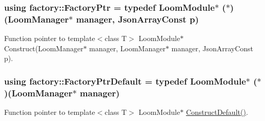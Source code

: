 \subsubsection[{\texorpdfstring{Factory\+Ptr}{FactoryPtr}}]{\setlength{\rightskip}{0pt plus 5cm}using {\bf factory\+::\+Factory\+Ptr} = typedef {\bf Loom\+Module}$\ast$ ($\ast$)({\bf Loom\+Manager}$\ast$ manager, Json\+Array\+Const p)}\hypertarget{namespacefactory_a3032a25e556f11cb0899c2b3abc95283}{}\label{namespacefactory_a3032a25e556f11cb0899c2b3abc95283}


Function pointer to \textquotesingle{}template$<$class T$>$ Loom\+Module$\ast$ Construct(\+Loom\+Manager$\ast$ manager, Loom\+Manager$\ast$ manager, Json\+Array\+Const p)\textquotesingle{}. 

\subsubsection[{\texorpdfstring{Factory\+Ptr\+Default}{FactoryPtrDefault}}]{\setlength{\rightskip}{0pt plus 5cm}using {\bf factory\+::\+Factory\+Ptr\+Default} = typedef {\bf Loom\+Module}$\ast$ ($\ast$)({\bf Loom\+Manager}$\ast$ manager)}\hypertarget{namespacefactory_aa63dbcb7fe5c455558ae48b029500d77}{}\label{namespacefactory_aa63dbcb7fe5c455558ae48b029500d77}


Function pointer to \textquotesingle{}template$<$class T$>$ Loom\+Module$\ast$ \hyperlink{_module___factory_8h_ad520abf333963919b93c320af42f4337}{Construct\+Default()}\textquotesingle{}. 

